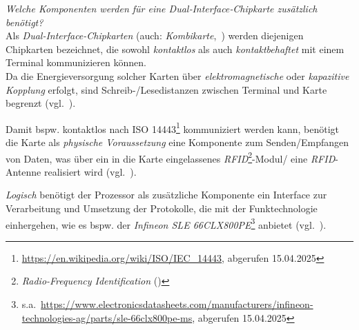 \textit{Welche Komponenten werden für eine Dual‐Interface‐Chipkarte zusätzlich benötigt?}\\

\noindent
Als \textit{Dual-Interface-Chipkarten} (auch: \textit{Kombikarte},~\cite[4]{ITS5}) werden diejenigen Chipkarten bezeichnet, die sowohl \textit{kontaktlos} als auch \textit{kontaktbehaftet} mit einem Terminal kommunizieren können.\\
Da die Energieversorgung solcher Karten über \textit{elektromagnetische} oder \textit{kapazitive Kopplung} erfolgt, sind Schreib-/Lesedistanzen zwischen Terminal und Karte begrenzt (vgl.~\cite[27]{ITS5}).

\noindent
Damit bspw. kontaktlos nach ISO 14443\footnote{
    \url{https://en.wikipedia.org/wiki/ISO/IEC_14443}, abgerufen 15.04.2025
} kommuniziert werden kann, benötigt die Karte als \textit{physische Voraussetzung} eine Komponente zum Senden/Empfangen von Daten, was über ein in die Karte eingelassenes \textit{RFID}\footnote{
    \textit{Radio-Frequency Identification} (\cite[95 f.]{ITS5})
}-Modul/ eine \textit{RFID}-Antenne realisiert wird (vgl.~\cite[27]{ITS5}).

\noindent
\textit{Logisch} benötigt der Prozessor als zusätzliche Komponente ein Interface zur Verarbeitung und Umsetzung der Protokolle, die mit der Funktechnologie einhergehen, wie es bspw. der \textit{Infineon SLE 66CLX800PE}\footnote{
    s.a.~\url{https://www.electronicsdatasheets.com/manufacturers/infineon-technologies-ag/parts/sle-66clx800pe-ms}, abgerufen 15.04.2025
}  anbietet (vgl.~\cite[11]{ITS5}).